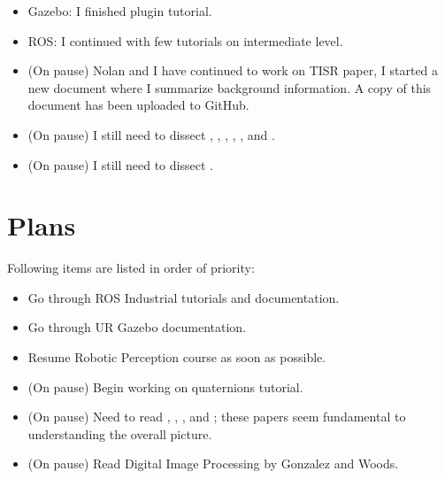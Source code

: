 \documentclass[11pt]{article}
\begin{document}
\begin{itemize}
    \item Gazebo: I finished plugin tutorial.
    
  	\item ROS: I continued with few tutorials on intermediate level. 
  
  	\item (On pause) Nolan and I have continued to work on TISR paper, I started a new document where I summarize background information. A copy of this document has been uploaded to GitHub.
 
  	\item (On pause) I still need to dissect \cite{PanopticSeg2019}, \cite{SVO}, \cite{HornsMethod}, \cite{NYUV2}, \cite{DGCNNLPC}, and \cite{MaskRCNN}.
  	
  	\item (On pause) I still need to dissect \cite{ZinsserWilliamKnowlton2006Oww}. 
\end{itemize}

\newpage 

\section{Plans}
Following items are listed in order of priority: 

\begin{itemize} 

	\item Go through ROS Industrial tutorials and documentation. 
	
	\item Go through UR Gazebo documentation. 

  	\item Resume Robotic Perception course as soon as possible.  
  
  	\item (On pause) Begin working on quaternions tutorial.  
 
  	\item (On pause) Need to read \cite{ImSRwDeepCNN}, \cite{MixDNNforSISR}, \cite{mModalSemanticSLAMwProb}, and \cite{RCANforImClass}; these papers seem fundamental to understanding the overall picture.

  	\item (On pause) Read Digital Image Processing by Gonzalez and Woods. 
 
 \end{itemize}



\newpage 
 

\end{document}
